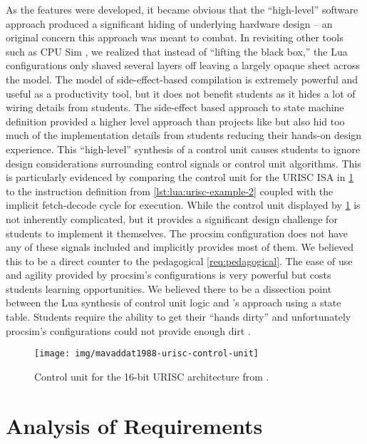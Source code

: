 As the features were developed, it became obvious that the ``high-level'' software approach produced a significant hiding of underlying hardware design -- an original concern this approach was meant to combat. In revisiting other tools such as CPU Sim \cite{Skrien2001}, we realized that instead of ``lifting the black box,'' the Lua configurations only shaved several layers off leaving a largely opaque sheet across the model. The model of side-effect-based compilation is extremely powerful and useful as a productivity tool, but it does not benefit students as it hides a lot of wiring details from students. The side-effect based approach to state machine definition provided a higher level approach than projects like \cite{Black2013} but also hid too much of the implementation details from students reducing their hands-on design experience. This ``high-level'' synthesis of a control unit causes students to ignore design considerations surrounding control signals or control unit algorithms. This is particularly evidenced by comparing the control unit for the URISC ISA in \cref{fig:mavaddat1988-urisc-control-unit} to the instruction definition from \cref{lst:lua:urisc-example-2} coupled with the implicit fetch-decode cycle for execution. While the control unit displayed by \cref{fig:mavaddat1988-urisc-control-unit} is not inherently complicated, but it provides a significant design challenge for students to implement it themselves. The procsim configuration does not have any of these signals included and implicitly provides most of them. We believed this to be a direct counter to the pedagogical \cref{req:pedagogical}. The ease of use and agility provided by procsim's configurations is very powerful but costs students learning opportunities. We believed there to be a dissection point between the Lua synthesis of control unit logic and \cite{Black2013}'s approach using a state table. Students require the ability to get their ``hands dirty'' and unfortunately procsim's configurations could not provide enough dirt \cite{Skrien2001,Garcia2009,Ackovska2014,Black2013}.

\begin{figure}[tp!]
    \centering
    \texttt{[image: img/mavaddat1988-urisc-control-unit]}
    \caption{Control unit for the 16-bit URISC architecture from \cite[p.~331]{Mavaddat1988}.}
    \label{fig:mavaddat1988-urisc-control-unit}
\end{figure}

\section{Analysis of Requirements}

